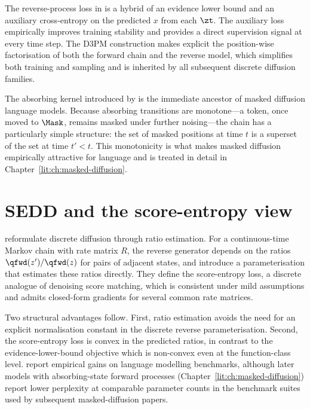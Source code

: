The reverse-process loss in \textcite{austin2021d3pm} is a hybrid of an
evidence lower bound and an auxiliary cross-entropy on the predicted $x$
from each $\zt$. The auxiliary loss empirically improves training stability
and provides a direct supervision signal at every time step. The D3PM
construction makes explicit the position-wise factorisation of both the
forward chain and the reverse model, which simplifies both training and
sampling and is inherited by all subsequent discrete diffusion families.

The absorbing kernel introduced by \textcite{austin2021d3pm} is the
immediate ancestor of masked diffusion language models. Because absorbing
transitions are monotone---a token, once moved to $\Mask$, remains masked
under further noising---the chain has a particularly simple structure: the
set of masked positions at time $t$ is a superset of the set at time
$t' < t$. This monotonicity is what makes masked diffusion empirically
attractive for language and is treated in detail in
Chapter~\ref{lit:ch:masked-diffusion}.

\section{SEDD and the score-entropy view}
\label{lit:sec:sedd}

\textcite{lou2024sedd} reformulate discrete diffusion through ratio
estimation. For a continuous-time Markov chain with rate matrix $R$, the
reverse generator depends on the ratios $\qfwd(z')/\qfwd(z)$ for pairs of
adjacent states, and \textcite{lou2024sedd} introduce a parameterisation
that estimates these ratios directly. They define the score-entropy loss,
a discrete analogue of denoising score matching, which is consistent under
mild assumptions and admits closed-form gradients for several common rate
matrices.

Two structural advantages follow. First, ratio estimation avoids the need
for an explicit normalisation constant in the discrete reverse
parameterisation. Second, the score-entropy loss is convex in the predicted
ratios, in contrast to the evidence-lower-bound objective which is
non-convex even at the function-class level. \textcite{lou2024sedd} report
empirical gains on language modelling benchmarks, although later models
with absorbing-state forward processes
(Chapter~\ref{lit:ch:masked-diffusion}) report lower perplexity at
comparable parameter counts in the benchmark suites used by subsequent
masked-diffusion papers.

